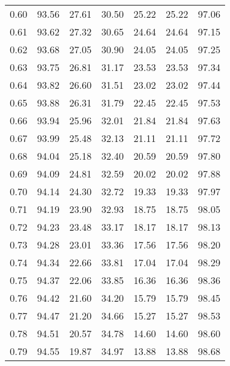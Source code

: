 \begin{tabular}{|c|c|c|c|c|c|c|}
      0.60 &     93.56 &     27.61 &      30.50 &   25.22 &      25.22 &         97.06 \\
      0.61 &     93.62 &     27.32 &      30.65 &   24.64 &      24.64 &         97.15 \\
      0.62 &     93.68 &     27.05 &      30.90 &   24.05 &      24.05 &         97.25 \\
      0.63 &     93.75 &     26.81 &      31.17 &   23.53 &      23.53 &         97.34 \\
      0.64 &     93.82 &     26.60 &      31.51 &   23.02 &      23.02 &         97.44 \\
      0.65 &     93.88 &     26.31 &      31.79 &   22.45 &      22.45 &         97.53 \\
      0.66 &     93.94 &     25.96 &      32.01 &   21.84 &      21.84 &         97.63 \\
      0.67 &     93.99 &     25.48 &      32.13 &   21.11 &      21.11 &         97.72 \\
      0.68 &     94.04 &     25.18 &      32.40 &   20.59 &      20.59 &         97.80 \\
      0.69 &     94.09 &     24.81 &      32.59 &   20.02 &      20.02 &         97.88 \\
      0.70 &     94.14 &     24.30 &      32.72 &   19.33 &      19.33 &         97.97 \\
      0.71 &     94.19 &     23.90 &      32.93 &   18.75 &      18.75 &         98.05 \\
      0.72 &     94.23 &     23.48 &      33.17 &   18.17 &      18.17 &         98.13 \\
      0.73 &     94.28 &     23.01 &      33.36 &   17.56 &      17.56 &         98.20 \\
      0.74 &     94.34 &     22.66 &      33.81 &   17.04 &      17.04 &         98.29 \\
      0.75 &     94.37 &     22.06 &      33.85 &   16.36 &      16.36 &         98.36 \\
      0.76 &     94.42 &     21.60 &      34.20 &   15.79 &      15.79 &         98.45 \\
      0.77 &     94.47 &     21.20 &      34.66 &   15.27 &      15.27 &         98.53 \\
      0.78 &     94.51 &     20.57 &      34.78 &   14.60 &      14.60 &         98.60 \\
      0.79 &     94.55 &     19.87 &      34.97 &   13.88 &      13.88 &         98.68 \\

\end{tabular}
